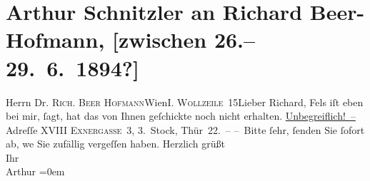 

         
         \renewcommand{\erwaehntePersonen}{Personen: Richard Beer-Hofmann, Friedrich Michael Fels}
         \renewcommand{\erwaehnteOrte}{Orte: Krütznergasse, Wien, Wollzeile}
         \renewcommand{\erwaehnteWerke}{}
               \section[Arthur Schnitzler an Richard Beer-Hofmann, {[}zwischen 26.–29. 6. 1894?{]}]{ Arthur Schnitzler an Richard Beer-Hofmann, {[}zwischen
               26.–29. 6. 1894?{]}}\nopagebreak{}\rehead{ }\begin{ledgroupsized}[t]{13cm}\normalsize\beginnumbering \toendnotes[C]{\smallbreak\pagebreak[2]} 
\pstart{}{\pb}Herrn Dr. \textsc{Rich. Beer
                     Hofmann}\pend{}\pstart{}Wien\pend{}\pstart{}I. \textsc{Wollzeile} 15\pend{}{\bigskip}\pstart{}{\pb}Lieber Richard,\pend\pstart
           Fels iſt eben bei mir, ſagt, hat das von Ihnen
               geſchickte noch nicht erhalten.\pend
           \pstart
           {\pb}\uline{Unbegreiflich! –}\pend
           \pstart
           Adreſſe \textsc{XVIII Exnergasse 3}, 3. Stock, Thür 22. –\pend
           \pstart
           – Bitte ſehr, ſenden Sie ſofort ab, we{\geminationn}
               Sie zufällig
               vergeſſen {\pb}haben.\pend
           \pstart
           Herzlich grüßt{\\[\baselineskip]}Ihr{\\[\baselineskip]}\spacefill\mbox{Arthur}\pend
           \leftskip=0em{}
         
         \endnumbering{}\end{ledgroupsized}  \newcommand{\dateiname}{L00341}\newcommand{\titel}{Arthur Schnitzler an Richard Beer-Hofmann, [zwischen 26.–29. 6. 1894?]}\newcommand{\editorInnen}{Martin Anton Müller und Gerd-Hermann Susen}
      